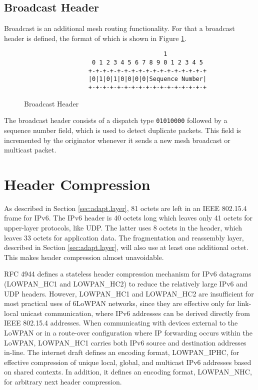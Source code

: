 \documentclass[12pt, titlepage, a4paper]{report}
\newenvironment{mylisting}
{\begin{list}{}{\setlength{\leftmargin}{1em}}\item\footnotesize}
{\end{list}}
\begin{document}
\subsection{Broadcast Header}\label{subsec:broad.header}
Broadcast is an additional mesh routing functionality. For that a broadcast header is defined, the format of which is shown in Figure \ref{fig:broad.header}.
\begin{figure}[htp]
\begin{mylisting}
\begin{verbatim}
                                       1
                   0 1 2 3 4 5 6 7 8 9 0 1 2 3 4 5
                  +-+-+-+-+-+-+-+-+-+-+-+-+-+-+-+-+
                  |0|1|0|1|0|0|0|0|Sequence Number|
                  +-+-+-+-+-+-+-+-+-+-+-+-+-+-+-+-+
\end{verbatim}
\end{mylisting}
\caption{Broadcast Header
}\label{fig:broad.header}
\end{figure}

The broadcast header consists of a dispatch type \texttt{01010000} followed by a sequence number field, which is used to detect duplicate packets.
This field is incremented by the originator whenever it sends a new mesh broadcast or multicast packet.

\section{Header Compression}\label{sec:hc}
As described in Section \ref{sec:adapt.layer}, 81 octets are left in an IEEE 802.15.4 frame for IPv6. The IPv6 header is 40 octets long which leaves only 41 octets for upper-layer protocols, like UDP.  The latter uses 8 octets in the header, which leaves 33 octets for application data.
The fragmentation and reassembly layer, described in Section \ref{sec:adapt.layer}, will also use at least one additional octet. This makes header compression almost unavoidable.

RFC 4944 \cite{rfc4944} defines a stateless header compression mechanism for IPv6 datagrams (LOWPAN\_HC1 and LOWPAN\_HC2) to reduce the relatively large IPv6 and UDP headers. However, LOWPAN\_HC1 and LOWPAN\_HC2 are insufficient for most practical uses of 6LoWPAN networks, since they are effective only for link-local unicast communication, where IPv6 addresses can be derived directly from IEEE 802.15.4 addresses. When communicating with devices external to the LoWPAN or in a route-over configuration where IP forwarding occurs within the LoWPAN, LOWPAN\_HC1 carries both IPv6 source and destination addresses in-line. The internet draft \cite{draft-hc-06} defines an encoding format, LOWPAN\_IPHC, for effective compression of unique local, global, and multicast IPv6 addresses based on shared contexts. In addition, it defines an encoding format, LOWPAN\_NHC, for arbitrary next header compression.
\end{document}
